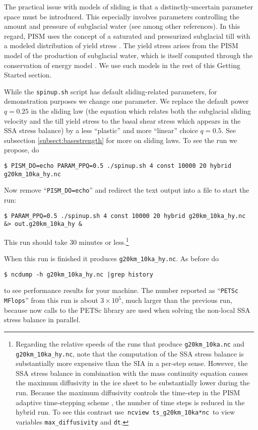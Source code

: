 The practical issue with models of sliding is that a distinctly-uncertain parameter space must be introduced.  This especially involves parameters controlling the amount and pressure of subglacial water (see \cite{AschwandenAdalgeirsdottirKhroulev,Clarke05,Tulaczyketal2000,vanPeltOerlemans2012} among other references).  In this regard, PISM uses the concept of a saturated and pressurized subglacial till with a modeled distribution of yield stress  \cite{BBssasliding,SchoofStream}.  The yield stress arises from the PISM model of the production of subglacial water, which is itself computed through the conservation of energy model \cite{AschwandenBuelerKhroulevBlatter}.  We use such models in the rest of this Getting Started section.

While the \texttt{spinup.sh} script has default sliding-related parameters, for demonstration purposes we change one parameter.  We replace the default power $q=0.25$ in the sliding law (the equation which relates both the subglacial sliding velocity and the till yield stress to the basal shear stress which appears in the SSA stress balance) by a less ``plastic'' and more ``linear'' choice $q=0.5$.  See subsection \ref{subsect:basestrength} for more on sliding laws.  To see the run we propose, do
\begin{verbatim}
$ PISM_DO=echo PARAM_PPQ=0.5 ./spinup.sh 4 const 10000 20 hybrid g20km_10ka_hy.nc
\end{verbatim}
Now remove ``\texttt{PISM_DO=echo}'' and redirect the text output into a file to start the run:
\begin{verbatim}
$ PARAM_PPQ=0.5 ./spinup.sh 4 const 10000 20 hybrid g20km_10ka_hy.nc &> out.g20km_10ka_hy &
\end{verbatim}
This run should take 30 minutes or less.\footnote{Regarding the relative speeds of the runs that produce \texttt{g20km_10ka.nc} and \texttt{g20km_10ka_hy.nc}, note that the computation of the SSA stress balance is substantially more expensive than the SIA in a per-step sense.  However, the SSA stress balance in combination with the mass continuity equation causes the maximum diffusivity in the ice sheet to be substantially lower during the run.  Because the maximum diffusivity controls the time-step in the PISM adaptive time-stepping scheme \cite{BBL}, the number of time steps is reduced in the hybrid run.  To see this contrast use\, \texttt{ncview ts_g20km_10ka*nc}\, to view variables \texttt{max_diffusivity} and \texttt{dt}.}

When this run is finished it produces \texttt{g20km_10ka_hy.nc}.  As before do
\begin{verbatim}
$ ncdump -h g20km_10ka_hy.nc |grep history
\end{verbatim}
to see performance results for your machine.  The number reported as ``\texttt{PETSc MFlops}'' from this run is about $3 \times 10^5$, much larger than the previous run, because now calls to the PETSc library are used when solving the non-local SSA stress balance in parallel.

